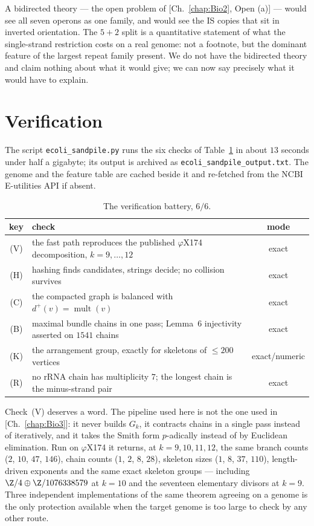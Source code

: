 \begin{remark}\label{Bio5:rem:bidirected}
A bidirected theory --- the open problem of [Ch.~\ref{chap:Bio2}, Open (a)] --- would see all seven
operons as one family, and would see the IS copies that sit in inverted orientation. The
$5+2$ split is a quantitative statement of what the single-strand restriction costs on a
real genome: not a footnote, but the dominant feature of the largest repeat family
present. We do not have the bidirected theory and claim nothing about what it would give;
we can now say precisely what it would have to explain.
\end{remark}

\section{Verification}\label{Bio5:sec:battery}

The script \texttt{ecoli\_sandpile.py} runs the six checks of Table~\ref{Bio5:tab:battery} in
about $13$ seconds under half a gigabyte; its output is archived as
\texttt{ecoli\_sandpile\_output.txt}. The genome and the feature table are cached beside
it and re-fetched from the NCBI E-utilities API if absent.

\begin{table}[ht]
\centering\small
\begin{tabular}{clc}
\toprule
key & check & mode\\
\midrule
(V) & the fast path reproduces the published $\varphi$X174 decomposition, $k=9,\dots,12$ & exact\\
(H) & hashing finds candidates, strings decide; no collision survives & exact\\
(C) & the compacted graph is balanced with $d^{+}(v)=\operatorname{mult}(v)$ & exact\\
(B) & maximal bundle chains in one pass; Lemma~6 injectivity asserted on $1541$ chains & exact\\
(K) & the arrangement group, exactly for skeletons of $\le200$ vertices & exact/numeric\\
(R) & no rRNA chain has multiplicity $7$; the longest chain is the minus-strand pair & exact\\
\bottomrule
\end{tabular}
\caption{The verification battery, $6/6$.}
\label{Bio5:tab:battery}
\end{table}

Check~(V) deserves a word. The pipeline used here is not the one used in [Ch.~\ref{chap:Bio3}]: it
never builds $G_k$, it contracts chains in a single pass instead of iteratively, and it
takes the Smith form $p$-adically instead of by Euclidean elimination. Run on
$\varphi$X174 it returns, at $k=9,10,11,12$, the same branch counts ($2$, $10$, $47$,
$146$), chain counts ($1$, $2$, $8$, $28$), skeleton sizes ($1$, $8$, $37$, $110$),
length-driven exponents and the same exact skeleton groups --- including
$\Z/4\oplus\Z/1076338579$ at $k=10$ and the seventeen elementary divisors at $k=9$. Three
independent implementations of the same theorem agreeing on a genome is the only
protection available when the target genome is too large to check by any other route.

